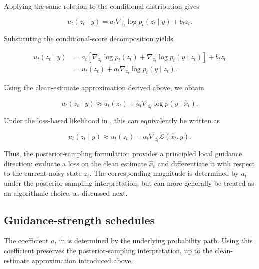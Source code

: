 Applying the same relation to the conditional distribution gives

\begin{equation}
    u_t(z_t\mid y)
    =
    a_t
    \nabla_{z_t}\log p_t(z_t\mid y)
    +
    b_t z_t.
\end{equation}

Substituting the conditional-score decomposition yields

\begin{align}
    u_t(z_t\mid y)
    &=
    a_t
    \left[
        \nabla_{z_t}\log p_t(z_t)
        +
        \nabla_{z_t}\log p_t(y\mid z_t)
    \right]
    +
    b_t z_t
    \\
    &=
    u_t(z_t)
    +
    a_t
    \nabla_{z_t}\log p_t(y\mid z_t).
    \label{eq:conditional-guided-velocity}
\end{align}

Using the clean-estimate approximation derived above, we obtain

\begin{equation}
    u_t(z_t\mid y)
    \approx
    u_t(z_t)
    +
    a_t
    \nabla_{z_t}\log p(y\mid\hat{x}_t).
    \label{eq:conditional-velocity-approximation}
\end{equation}

Under the loss-based likelihood in , this can
equivalently be written as

\begin{equation}
    u_t(z_t\mid y)
    \approx
    u_t(z_t)
    -
    a_t
    \nabla_{z_t}\mathcal{L}(\hat{x}_t,y).
    \label{eq:conditional-velocity-loss}
\end{equation}

Thus, the posterior-sampling formulation provides a principled local guidance
direction: evaluate a loss on the clean estimate $\hat{x}_t$ and differentiate
it with respect to the current noisy state $z_t$. The corresponding magnitude
is determined by $a_t$ under the posterior-sampling interpretation, but can
more generally be treated as an algorithmic choice, as discussed next.

\subsection{Guidance-strength schedules}
\label{sec:guidance-strength-schedules}

The coefficient $a_t$ in  is determined
by the underlying probability path.
Using this coefficient preserves the posterior-sampling interpretation, up to
the clean-estimate approximation introduced above.

